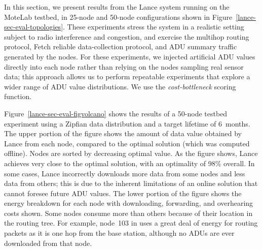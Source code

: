 In this section, we present results from the Lance system running on the
MoteLab testbed, in 25-node and 50-node configurations shown in
Figure~\ref{lance-sec-eval-topologies}. These experiments stress the system
in a realistic setting subject to radio interference and congestion, and
exercise the multihop routing protocol, Fetch reliable data-collection
protocol, and ADU summary traffic generated by the nodes. For these
experiments, we injected artificial ADU values directly into each node rather
than relying on the nodes sampling real sensor data; this approach allows us
to perform repeatable experiments that explore a wider range of ADU value
distributions. We use the \textit{cost-bottleneck} scoring function.

Figure~\ref{lance-sec-eval-figvolcano} shows the results of a 50-node testbed
experiment using a Zipfian data distribution and a target lifetime of
6~months. The upper portion of the figure shows the amount of data value
obtained by Lance from each node, compared to the optimal solution (which was
computed offline). Nodes are sorted by decreasing optimal value. As the
figure shows, Lance achieves very close to the optimal solution, with an
optimality of 98\% overall. In some cases, Lance incorrectly downloads more
data from some nodes and less data from others; this is due to the inherent
limitations of an online solution that cannot foresee future ADU values. The
lower portion of the figure shows the energy breakdown for each node with
downloading, forwarding, and overhearing costs shown. Some nodes consume
more than others because of their location in the routing tree. For example,
node~103 in uses a great deal of energy for routing packets as it is one hop
from the base station, although no ADUs are ever downloaded from that node.

